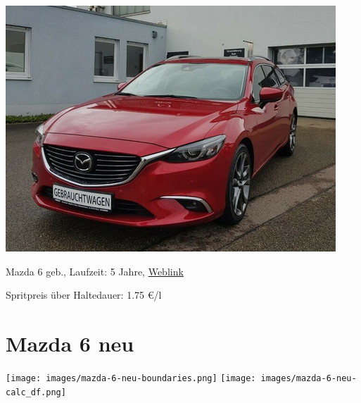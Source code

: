 \documentclass[landscape, DIV=99, 14pt]{scrartcl}
\begin{document}
\pagebreak
\null
\vspace{2cm}
\begin{center}
\includegraphics[width=0.9\columnwidth]{cars/mazda-6-alt.png}

Mazda 6 geb., Laufzeit: 5 Jahre, \href{https://suchen.mobile.de/fahrzeuge/details.html?action=parkItem&id=332186075}{Weblink}

Spritpreis \"uber Haltedauer: 1.75 \euro{}/l

\end{center}

\pagebreak


\twocolumn

\section*{Mazda 6 neu}
\begin{center}
\texttt{[image: images/mazda-6-neu-boundaries.png]}
\null
\vspace{0.5cm}
\texttt{[image: images/mazda-6-neu-calc\_df.png]}
\end{center}
\end{document}
